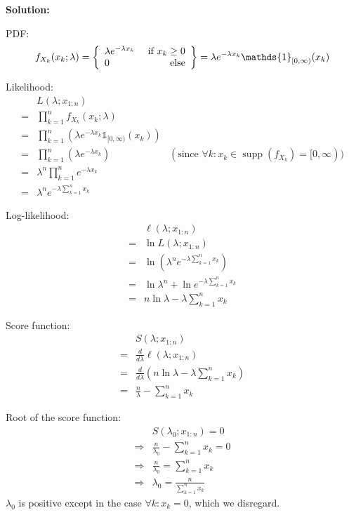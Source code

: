 \documentclass{article}
\begin{document}
\textbf{Solution:}
\begin{ssolution}

PDF:
\[f_{X_k}(x_k;\lambda) = \casesii{\lambda e^{-\lambda x_k}}{x_k\geq 0}{0} = \lambda e^{-\lambda x_k}\mathds{1}_{[0,\infty)}(x_k)\]

Likelihood:
\begin{align*}
	& L(\lambda;x_{1:n}) \\
	=& \prod_{k=1}^n f_{X_k}(x_k;\lambda) \\
	=& \prod_{k=1}^n \left( \lambda e^{-\lambda x_k} \mathds{1}_{[0,\infty)}(x_k) \right) \\
	=& \prod_{k=1}^n \left(\lambda e^{-\lambda x_k}\right) & (\text{since } \forall k:x_k \in \operatorname{supp}(f_{X_k})=[0,\infty)) \\
	=& \lambda^n \prod_{k=1}^n e^{-\lambda x_k} \\
	=& \lambda^n e^{-\lambda \sum_{k=1}^n x_k}
\end{align*}

Log-likelihood:
\begin{align*}
	& \ell(\lambda;x_{1:n}) \\
	=& \ln L(\lambda;x_{1:n}) \\
	=& \ln \left( \lambda^n e^{-\lambda \sum_{k=1}^n x_k} \right) \\
	=& \ln \lambda^n + \ln e^{-\lambda \sum_{k=1}^n x_k} \\
	=& n\ln \lambda -\lambda \sum_{k=1}^n x_k
\end{align*}

Score function:
\begin{align*}
	& S(\lambda;x_{1:n}) \\
	=& \frac{d}{d\lambda} \ell(\lambda;x_{1:n}) \\
	=& \frac{d}{d\lambda} \left( n\ln \lambda -\lambda \sum_{k=1}^n x_k \right) \\
	=& \frac{n}{\lambda} -\sum_{k=1}^n x_k
\end{align*}

Root of the score function:
\begin{align*}
	& S(\lambda_0;x_{1:n}) = 0 \\
	\Rightarrow& \frac{n}{\lambda_0} -\sum_{k=1}^n x_k = 0 \\
	\Rightarrow& \frac{n}{\lambda_0} = \sum_{k=1}^n x_k \\
	\Rightarrow& \lambda_0 = \frac{n}{\sum_{k=1}^n x_k}
\end{align*}
\(\lambda_0\) is positive except in the case \(\forall k: x_k=0\), which we disregard.


\end{ssolution}
\end{document}
